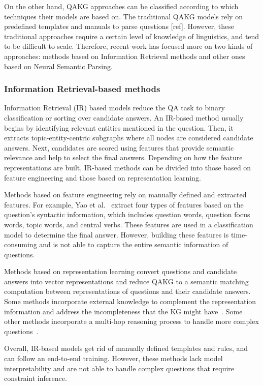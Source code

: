 On the other hand, QAKG approaches can be classified according to which techniques their models 
are based on. The traditional QAKG models rely on predefined templates and manuals to parse 
questions [ref]. However, these traditional approaches require a certain level of knowledge of 
linguistics, and tend to be difficult to scale. Therefore, recent work has focused more on two 
kinds of approaches: methods based on Information Retrieval methods and other ones based on 
Neural Semantic Parsing.

\subsubsection{Information Retrieval-based methods}
Information Retrieval (IR) based models reduce the QA task to binary classification or sorting 
over candidate answers. An IR-based method usually begins by identifying relevant entities 
mentioned in the question. Then, it extracts topic-entity-centric subgraphs where all nodes are 
considered candidate answers. Next, candidates are scored using features that provide semantic 
relevance and help to select the final answers. Depending on how the feature representations 
are built, IR-based methods can be divided into those based on feature engineering and those 
based on representation learning.

Methods based on feature engineering rely on manually defined and extracted features. For 
example, Yao et al.~\cite{qa:YaoD14} extract four types of features based on the question’s 
syntactic information, which includes question words, question focus words, topic words, and 
central verbs. These features are used in a classification model to determine the final answer. 
However, building these features is time-consuming and is not able to capture the entire 
semantic information of questions.

Methods based on representation learning convert questions and candidate answers into vector 
representations and reduce QAKG to a semantic matching computation between representations of 
questions and their candidate answers. Some methods incorporate external knowledge to complement 
the representation information and address the incompleteness that the KG might 
have~\cite{qa:XuRFHZ16,qa:SunDZMSC18,qa:TrouillonWRGB16}. Some other methods incorporate a 
multi-hop reasoning process to handle more complex questions~\cite{SukhbaatarSWF15,qa:MillerFDKBW16,qa:QiuWJZ20}.

Overall, IR-based models get rid of manually defined templates and rules, and can follow an 
end-to-end training. However, these methods lack model interpretability and are not able to 
handle complex questions that require constraint inference.

